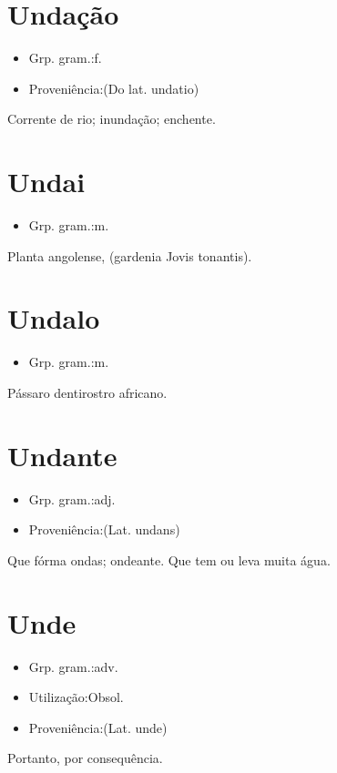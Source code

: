 \documentclass{article}
\begin{document}
\section{Undação}
\begin{itemize}
\item {Grp. gram.:f.}
\end{itemize}
\begin{itemize}
\item {Proveniência:(Do lat. \textunderscore undatio\textunderscore )}
\end{itemize}
Corrente de rio; inundação; enchente.
\section{Undai}
\begin{itemize}
\item {Grp. gram.:m.}
\end{itemize}
Planta angolense, (\textunderscore gardenia Jovis tonantis\textunderscore ).
\section{Undalo}
\begin{itemize}
\item {Grp. gram.:m.}
\end{itemize}
Pássaro dentirostro africano.
\section{Undante}
\begin{itemize}
\item {Grp. gram.:adj.}
\end{itemize}
\begin{itemize}
\item {Proveniência:(Lat. \textunderscore undans\textunderscore )}
\end{itemize}
Que fórma ondas; ondeante.
Que tem ou leva muita água.
\section{Unde}
\begin{itemize}
\item {Grp. gram.:adv.}
\end{itemize}
\begin{itemize}
\item {Utilização:Obsol.}
\end{itemize}
\begin{itemize}
\item {Proveniência:(Lat. \textunderscore unde\textunderscore )}
\end{itemize}
Portanto, por consequência.
\end{document}
